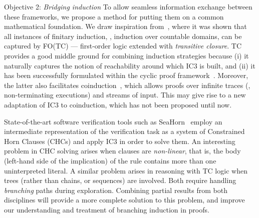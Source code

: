 \begin{paragraph}{Objective 2: {\it Bridging induction}}
To allow seamless information exchange between these frameworks, we propose a method for putting them on a common mathematical foundation.
We draw inspiration from~\cite{Book2003:Avron}, where it was shown that all instances of finitary induction, \ie, induction over countable domains, can be captured by FO(TC) --- first-order logic extended with \emph{transitive closure}.
TC provides a good middle ground for combining induction strategies because
(i) it naturally captures the notion of reachability around which IC3 is built, and
(ii) it has been successfully formulated within the cyclic proof framework~\cite{TOCL2020:Cohen}.
Moreover, the latter also facilitates coinduction~\cite{IJCAR2020:Cohen}, which allows proofs over infinite traces (\ie, non-terminating executions) and streams of input.
This may give rise to a new adaptation of IC3 to coinduction, which has not been proposed until now.

State-of-the-art software verification tools such as SeaHorn~\cite{TACAS2015:Gurfinkel} employ an intermediate representation of the verification task as a system of Constrained Horn Clauses (CHCs) %
and apply IC3 in order to solve them.
An interesting problem in CHC solving arises when clauses are \emph{non-linear}, that is, the body (left-hand side of the implication) of the rule contains more than one uninterpreted literal.
A similar problem arises in reasoning with TC logic when trees (rather than chains, or sequences) are involved.
Both require handling \emph{branching} paths during exploration.
Combining partial results from both disciplines will provide a more complete solution to this problem,
and improve our understanding and treatment of branching induction in proofs.


\end{paragraph}



